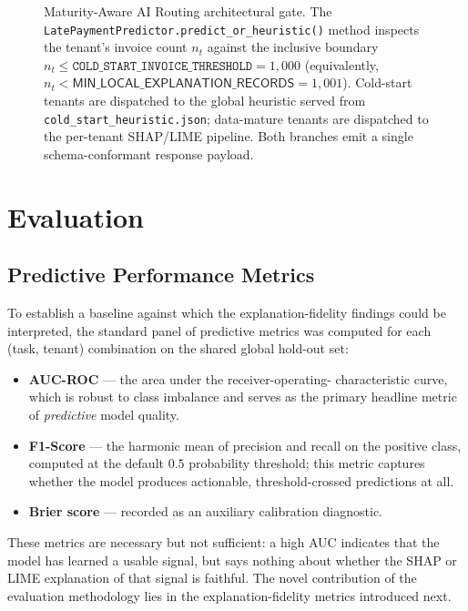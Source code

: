 \begin{figure}[h]
    \caption{Maturity-Aware AI Routing architectural gate. The
    \texttt{LatePaymentPredictor.predict\_or\_heuristic()} method inspects the
    tenant's invoice count $n_t$ against the inclusive boundary
    $n_t \le \texttt{COLD\_START\_INVOICE\_THRESHOLD} = 1{,}000$
    (equivalently, $n_t < \textsf{MIN\_LOCAL\_EXPLANATION\_RECORDS} = 1{,}001$).
    Cold-start tenants are dispatched to the global heuristic served from
    \texttt{cold\_start\_heuristic.json}; data-mature tenants are dispatched
    to the per-tenant SHAP/LIME pipeline. Both branches emit a single
    schema-conformant response payload.}
    \label{fig:routing-arch}
\end{figure}

\section{Evaluation}
\label{sec:meth-evaluation}

\subsection{Predictive Performance Metrics}
\label{subsec:pred-metrics}

To establish a baseline against which the explanation-fidelity findings
could be interpreted, the standard panel of predictive metrics was computed
for each (task, tenant) combination on the shared global hold-out set:

\begin{itemize}
    \item \textbf{AUC-ROC} --- the area under the receiver-operating-
    characteristic curve, which is robust to class imbalance and serves as
    the primary headline metric of \emph{predictive} model quality.
    \item \textbf{F1-Score} --- the harmonic mean of precision and recall on
    the positive class, computed at the default $0.5$ probability
    threshold; this metric captures whether the model produces actionable,
    threshold-crossed predictions at all.
    \item \textbf{Brier score} --- recorded as an auxiliary calibration
    diagnostic.
\end{itemize}

These metrics are necessary but not sufficient: a high AUC indicates that
the model has learned a usable signal, but says nothing about whether the
SHAP or LIME explanation of that signal is faithful. The novel contribution
of the evaluation methodology lies in the explanation-fidelity metrics
introduced next.

